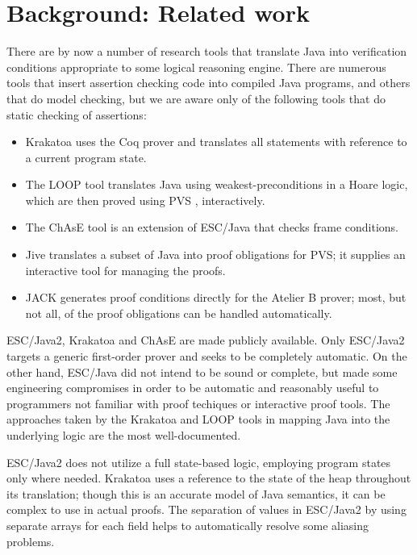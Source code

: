 \documentclass{sig-alternate}
\begin{document}
\section{Background: Related work}

There are by now a number of research tools that translate Java into verification conditions
appropriate to some logical reasoning engine.  There are numerous tools that insert
assertion checking code into compiled Java programs, and others that do model checking,
but
we are aware only of the following tools that do static
checking of assertions:
\begin{itemize}
\setlength{\itemsep}{0in}
\item Krakatoa \cite{krakatoa03a} uses the Coq prover and 
translates all statements with reference to a current program state. 
\item The LOOP tool \cite{JacobsPoll01a,Jacobs03}
 translates Java using weakest-preconditions in a Hoare logic,
which are then proved using PVS \cite{OwreRRSS96}, interactively.  
\item The ChAsE tool \cite{CH03} is an extension of ESC/Java that checks frame conditions.
\item Jive \cite{MeyerMuellerPoetzsch-Heffter00} translates a subset of Java into proof
obligations for PVS; it supplies an interactive tool for managing the proofs.
\item JACK \cite{JACK} generates proof conditions directly for the Atelier B prover; 
most, but not all, of
the proof obligations can be handled automatically. 
\end{itemize}

ESC/Java2, Krakatoa and ChAsE are made publicly available.  Only ESC/Java2 targets a
generic first-order prover and seeks to be completely automatic.  On the other hand, ESC/Java
did not intend to be sound or complete, but made some engineering compromises in order to
be automatic and reasonably useful to programmers not familiar with proof techiques or
interactive proof tools.  The approaches taken by the Krakatoa and LOOP tools in mapping
Java into the underlying logic are the most well-documented.

ESC/Java2 does not utilize a full state-based logic, employing program states only where needed.
Krakatoa uses a reference to the state of the heap throughout its translation; though this is an
accurate model of Java semantics, it can be complex to use in actual proofs.  The separation of
values in ESC/Java2 by using separate arrays for each field helps to automatically resolve some
aliasing problems.
\end{document}
